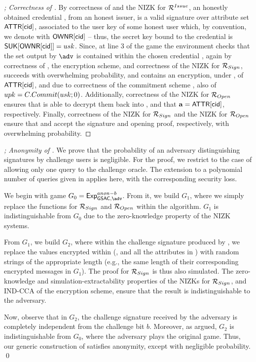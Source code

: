 \begin{proof}[; Correctness of \GSACGen]
  By correctness of \SBCM and the NIZK for $\mathcal{R}^{Issue}$, an honestly
  obtained credential \cid, from an honest issuer, is a valid \SBCM signature
  over
  attribute set $\mathsf{ATTR}[\mathsf{cid}]$, associated to the user key of some honest user
  which, by convention, we denote with $\mathsf{OWNR}[\mathsf{cid}]$ -- thus, the secret key
  bound to the credential is $\mathsf{S}\mathsf{UK}[\mathsf{OWNR}[\mathsf{cid}]]=usk$. Since, at line 3 of the
  \ExpGSACCorrect game the environment checks that the \dattrs set output by
  $\adv$ is contained within the chosen credential \cid, again by correctness of
  \SBCM, the encryption scheme, and correctness of the NIZK for
  $\mathcal{R}_{Sign}$, \Sign succeeds with overwhelming
  probability, and \sig contains an encryption, under \opk, of $\mathsf{ATTR}[\mathsf{cid}]$,
  and due to correctness of the commitment scheme \C, also of $upk =
  C.Commit(usk;0)$. Additionally, correctness of the NIZK for
  $\mathcal{R}_{Open}$ ensures that \Open is able to decrypt them back into \upk,
  and that $\mathbf{a}=
  \mathsf{ATTR}[\mathsf{cid}]$, respectively. Finally, correctness of the NIZK for
  $\mathcal{R}_{Sign}$ and the NIZK for $\mathcal{R}_{Open}$ ensure that \Verify and
  \Judge accept the signature and opening proof, respectively, with overwhelming
  probability.
\end{proof}

\begin{proof}[; Anonymity of \GSACGen]
  We prove that the probability of an adversary distinguishing signatures by
  challenge users is negligible. For the proof, we restrict to the case of
  allowing only one query to the challenge oracle. The extension to a polynomial
  number of queries given in \cite{bsz05} applies here, with the corresponding
  security loss.

  We begin with game $G_0=\ExpGSACAnonb$. From it, we build $G_1$, where we
  simply replace the \NIZKSetup functions for $\mathcal{R}_{Sign}$ and
  $\mathcal{R}_{Open}$ within the \Setup algorithm. $G_1$ is indistinguishable
  from $G_0$ due to the zero-knowledge property of the NIZK systems.

  From $G_1$, we build $G_2$, where within the challenge signature produced by
  \CHALb, we replace the values encrypted within \Sign (\Ccom, and all the
  attributes in \attrs) with random strings of the appropriate length (e.g.,
  the same length of their corresponding encrypted messages in $G_1$). The
  proof for $\mathcal{R}_{Sign}$ is thus
  also simulated. The zero-knowledge and simulation-extractability properties
  of the NIZKs for $\mathcal{R}_{Sign}$, and IND-CCA of the encryption
  scheme, ensure that the result is indistinguishable to the adversary.

  Now, observe that in $G_2$, the challenge signature received by the adversary
  is completely independent from the challenge bit $b$. Moreover, as argued,
  $G_2$ is indistinguishable from $G_0$, where the adversary plays the original
  \ExpGSACAnonb game. Thus, our generic construction of \GSAC satisfies
  anonymity, except with negligible probability.
  \qed
\end{proof}

